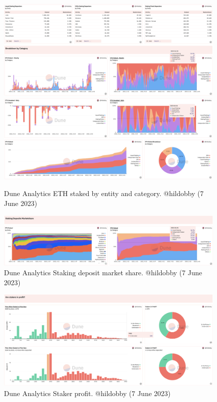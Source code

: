 \documentclass[UTF8]{article}
\begin{document}
\begin{figure}[htbp]
\begin{center}
\includegraphics[width=\linewidth]{images/hildobby8}\\
\includegraphics[width=\linewidth]{images/hildobby9}
\caption{Dune Analytics ETH staked by entity and category. @hildobby  (7 June 2023)}
\label{fig:hildobby8}
\end{center}
\end{figure}


\begin{figure}[htbp]
\begin{center}
\includegraphics[width=\linewidth]{images/hildobby10}
\caption{Dune Analytics Staking deposit market share. @hildobby  (7 June 2023)}
\label{fig:hildobby=10}
\end{center}
\end{figure}

\begin{figure}[htbp]
\begin{center}
\includegraphics[width=\linewidth]{images/hildobby11}
\caption{Dune Analytics Staker profit. @hildobby  (7 June 2023)}
\label{fig:hildobby=11}
\end{center}
\end{figure}
\end{document}
